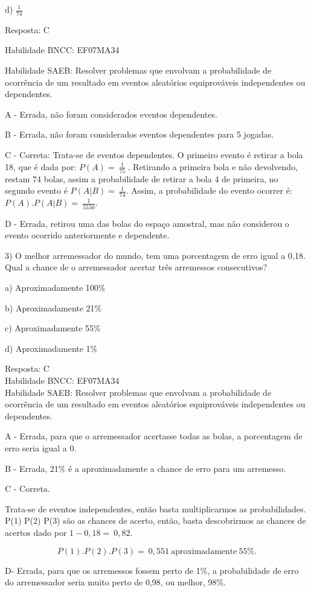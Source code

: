 {{{{{{{{{{{{{d) \(\frac{1}{74}\)

Resposta: C

Habilidade BNCC: EF07MA34

Habilidade SAEB: Resolver problemas que envolvam a probabilidade de
ocorrência de um resultado em eventos aleatórios equiprováveis
independentes ou dependentes.

A - Errada, não foram considerados eventos dependentes.

B - Errada, não foram considerados eventos dependentes para 5 jogadas.

C - Correta: Trata-se de eventos dependentes. O primeiro evento é
retirar a bola 18, que é dada por: \(P(A) = \ \frac{1}{75}\ \).
Retirando a primeira bola e não devolvendo, restam 74 bolas, assim a
probabilidade de retirar a bola 4 de primeira, no segundo evento é
\(P(A|B) = \ \frac{1}{74}\). Assim, a probabilidade do evento ocorrer é:
\(P(A).P(A|B) = \ \frac{1}{5550}\).

D - Errada, retirou uma das bolas do espaço amostral, mas não considerou
o evento ocorrido anteriormente e dependente.

3) O melhor arremessador do mundo, tem uma porcentagem de erro igual a
0,18. Qual a chance de o arremessador acertar três arremessos
consecutivos?

a) Aproximadamente 100\%

b) Aproximadamente 21\%

c) Aproximadamente 55\%

d) Aproximadamente 1\%

Resposta: C\\
Habilidade BNCC: EF07MA34\\
Habilidade SAEB: Resolver problemas que envolvam a probabilidade de
ocorrência de um resultado em eventos aleatórios equiprováveis
independentes ou dependentes.

A - Errada, para que o arremessador acertasse todas as bolas, a
porcentagem de erro seria igual a 0.

B - Errada, 21\% é a aproximadamente a chance de erro para um arremesso.

C - Correta.

Trata-se de eventos independentes, então basta multiplicarmos as
probabilidades. P(1) P(2) P(3) são as chances de acerto, então, basta
descobrirmos as chances de acertos dado por \(1 - 0,18 = \ 0,82.\)

\[P(1).P(2).P(3) = \ 0,551\ \text{aproximadamente}\ 55\%.\]

D- Errada, para que os arremessos fossem perto de 1\%, a probabilidade
de erro do arremessador seria muito perto de 0,98, ou melhor, 98\%.

}}}}}}}}}}}}}
